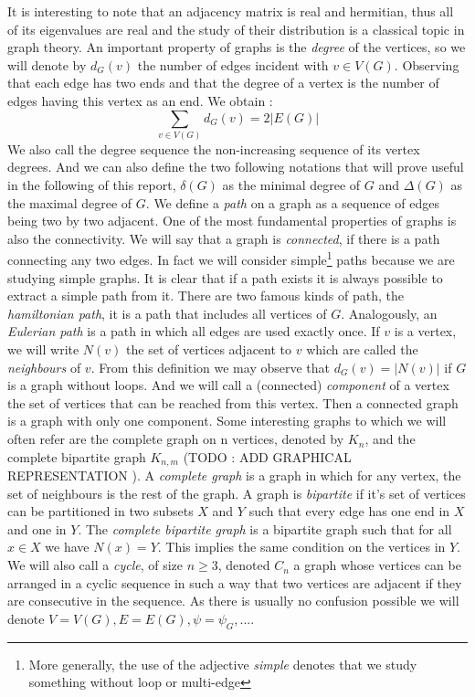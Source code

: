It is interesting to note that an adjacency matrix is real and hermitian, thus all of its eigenvalues are real and the study of their distribution is a classical topic in graph theory.
\newline
An important property of graphs is the \emph{degree} of the vertices, so we will denote by $d_G(v)$ the number of edges incident with $v \in V(G)$.
Observing that each edge has two ends and that the degree of a vertex is the number of edges having this vertex as an end. We obtain :
\begin{equation}
	\sum_{v\in V(G)} d_G(v) = 2 |E(G)|
\end{equation}
We also call the degree sequence the non-increasing sequence of its vertex degrees.
And we can also define the two following notations that will prove useful in the following of this report, $\delta(G)$ as the minimal degree of $G$ and $\Delta(G)$ as the maximal degree of $G$.
\newline
We define a \emph{path} on a graph as a sequence of edges being two by two adjacent. 
One of the most fundamental properties of graphs is also the connectivity.
We will say that a graph is \emph{connected}, if there is a path connecting any two edges. 
In fact we will consider simple\footnote{ More generally, the use of the adjective \emph{simple} denotes that we study something without loop or multi-edge}  paths because we are studying simple graphs.
It is clear that if a path exists it is always possible to extract a simple path from it.
There are two famous kinds of path, the \emph{hamiltonian path}, it is a path that includes all vertices of $G$. Analogously, an \emph{Eulerian path} is a path in which all edges are used exactly once.
\newline
If $v$ is a vertex, we will write $N(v)$ the set of vertices adjacent to $v$ which are called the \emph{neighbours} of $v$.
From this definition we may observe that $d_G(v) = |N(v)|$ if $G$ is a graph without loops. 
And we will call a (connected) \emph{component} of a vertex the set of vertices that can be reached from this vertex. 
Then a connected graph is a graph with only one component.
\newline
Some interesting graphs to which we will often refer are the complete graph on n vertices, denoted by $K_n$, and the complete bipartite graph $K_{n,m}$ (TODO : ADD GRAPHICAL REPRESENTATION ). 
A \emph{complete graph} is a graph in which for any vertex, the set of neighbours is the rest of the graph. 
A graph is \emph{bipartite} if it's set of vertices can be partitioned in two subsets $X$ and $Y$ such that every edge has one end in $X$ and one in $Y$. 
The \emph{complete bipartite graph} is a bipartite graph such that for all $x \in X$ we have $N(x) = Y$. 
This implies the same condition on the vertices in $Y$.
We will also call a \emph{cycle}, of size $n \geq 3$, denoted $C_n$ a graph whose vertices can be arranged in a cyclic sequence in such a way that two vertices are adjacent if they are consecutive in the sequence.
\newline
As there is usually no confusion possible we will denote $V = V(G), E =E(G), \psi = \psi_G, ...$. 


